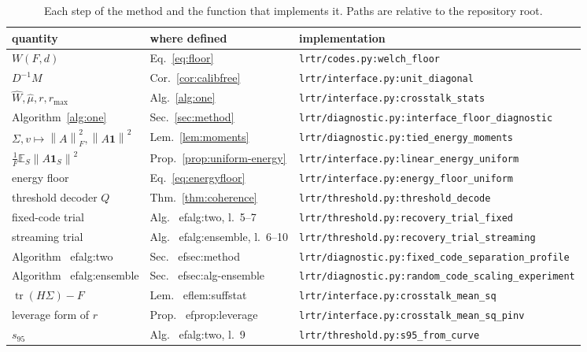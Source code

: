 \documentclass[preprint,12pt]{elsarticle}
\theoremstyle{definition}
\newcommand{\E}{\mathbb{E}}
\newcommand{\norm}[1]{\left\lVert #1 \right\rVert}
\newcommand{\code}[1]{\texttt{\small #1}}
\begin{document}
\begin{table}[t]
\centering
\caption{Each step of the method and the function that implements it. Paths are relative to
the repository root.}
\label{tab:codemap}
\small
\begin{tabular}{lll}
\toprule
quantity & where defined & implementation \\
\midrule
$W(F,d)$ & Eq.~\eqref{eq:floor} & \code{lrtr/codes.py:welch\_floor} \\
$D^{-1}M$ & Cor.~\ref{cor:calibfree} & \code{lrtr/interface.py:unit\_diagonal} \\
$\widehat W,\widehat\mu,r,r_{\max}$ & Alg.~\ref{alg:one} & \code{lrtr/interface.py:crosstalk\_stats} \\
Algorithm~\ref{alg:one} & Sec.~\ref{sec:method} & \code{lrtr/diagnostic.py:interface\_floor\_diagnostic} \\
$\Sigma,v\mapsto\norm{A}_F^2,\norm{A\mathbf 1}^2$ & Lem.~\ref{lem:moments} & \code{lrtr/diagnostic.py:tied\_energy\_moments} \\
$\frac1F\E_S\norm{A\mathbf 1_S}^2$ & Prop.~\ref{prop:uniform-energy} & \code{lrtr/interface.py:linear\_energy\_uniform} \\
energy floor & Eq.~\eqref{eq:energyfloor} & \code{lrtr/interface.py:energy\_floor\_uniform} \\
threshold decoder $Q$ & Thm.~\ref{thm:coherence} & \code{lrtr/threshold.py:threshold\_decode} \\
fixed-code trial & Alg.~
ef{alg:two}, l.~5--7 & \code{lrtr/threshold.py:recovery\_trial\_fixed} \\
streaming trial & Alg.~
ef{alg:ensemble}, l.~6--10 & \code{lrtr/threshold.py:recovery\_trial\_streaming} \\
Algorithm~
ef{alg:two} & Sec.~
ef{sec:method} & \code{lrtr/diagnostic.py:fixed\_code\_separation\_profile} \\
Algorithm~
ef{alg:ensemble} & Sec.~
ef{sec:alg-ensemble} & \code{lrtr/diagnostic.py:random\_code\_scaling\_experiment} \\
$\operatorname{tr}(H\Sigma)-F$ & Lem.~
ef{lem:suffstat} & \code{lrtr/interface.py:crosstalk\_mean\_sq} \\
leverage form of $r$ & Prop.~
ef{prop:leverage} & \code{lrtr/interface.py:crosstalk\_mean\_sq\_pinv} \\
$s_{95}$ & Alg.~
ef{alg:two}, l.~9 & \code{lrtr/threshold.py:s95\_from\_curve} \\
\bottomrule
\end{tabular}
\end{table}
\end{document}

